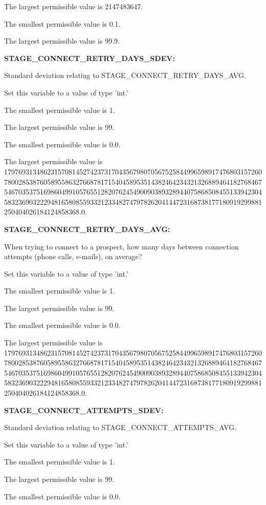 The largest permissible value is 2147483647.

The smallest permissible value is 0.1.

The largest permissible value is 99.9.


\textbf{STAGE\_CONNECT\_RETRY\_DAYS\_SDEV:}


Standard deviation relating to STAGE\_CONNECT\_RETRY\_DAYS\_AVG.

Set this variable to a value of type 'int.'

The smallest permissible value is 1.

The largest permissible value is 99.

The smallest permissible value is 0.0.

The largest permissible value is 179769313486231570814527423731704356798070567525844996598917476803157260780028538760589558632766878171540458953514382464234321326889464182768467546703537516986049910576551282076245490090389328944075868508455133942304583236903222948165808559332123348274797826204144723168738177180919299881250404026184124858368.0.


\textbf{STAGE\_CONNECT\_RETRY\_DAYS\_AVG:}


When trying to connect to a prospect, how many days between connection attempts (phone calls, e-mails), on average?

Set this variable to a value of type 'int.'

The smallest permissible value is 1.

The largest permissible value is 99.

The smallest permissible value is 0.0.

The largest permissible value is 179769313486231570814527423731704356798070567525844996598917476803157260780028538760589558632766878171540458953514382464234321326889464182768467546703537516986049910576551282076245490090389328944075868508455133942304583236903222948165808559332123348274797826204144723168738177180919299881250404026184124858368.0.


\textbf{STAGE\_CONNECT\_ATTEMPTS\_SDEV:}


Standard deviation relating to STAGE\_CONNECT\_ATTEMPTS\_AVG.

Set this variable to a value of type 'int.'

The smallest permissible value is 1.

The largest permissible value is 99.

The smallest permissible value is 0.0.

